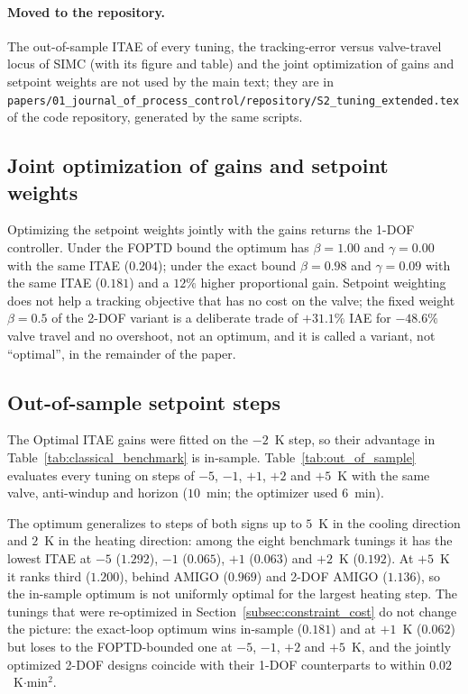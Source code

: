 \paragraph{Moved to the repository.} The out-of-sample ITAE of every tuning, the tracking-error versus valve-travel locus of SIMC (with its figure and table) and the joint optimization of gains and setpoint weights are not used by the main text; they are in \texttt{papers/01\_journal\_of\_process\_control/repository/S2\_tuning\_extended.tex} of the code repository, generated by the same scripts.



\subsection{Joint optimization of gains and setpoint weights}
Optimizing the setpoint weights jointly with the gains returns the 1-DOF controller. Under the FOPTD bound the optimum has $\beta = 1.00$ and $\gamma = 0.00$ with the same ITAE ($0.204$); under the exact bound $\beta = 0.98$ and $\gamma = 0.09$ with the same ITAE ($0.181$) and a $12\%$ higher proportional gain. Setpoint weighting does not help a tracking objective that has no cost on the valve; the fixed weight $\beta = 0.5$ of the 2-DOF variant is a deliberate trade of $+31.1\%$ IAE for $-48.6\%$ valve travel and no overshoot, not an optimum, and it is called a variant, not ``optimal'', in the remainder of the paper.


\subsection{Out-of-sample setpoint steps}
\label{subsec:oos}
The Optimal ITAE gains were fitted on the $-2$~K step, so their advantage in Table~\ref{tab:classical_benchmark} is in-sample. Table~\ref{tab:out_of_sample} evaluates every tuning on steps of $-5$, $-1$, $+1$, $+2$ and $+5$~K with the same valve, anti-windup and horizon ($10$~min; the optimizer used $6$~min).



The optimum generalizes to steps of both signs up to $5$~K in the cooling direction and $2$~K in the heating direction: among the eight benchmark tunings it has the lowest ITAE at $-5$ ($1.292$), $-1$ ($0.065$), $+1$ ($0.063$) and $+2$~K ($0.192$). At $+5$~K it ranks third ($1.200$), behind AMIGO ($0.969$) and 2-DOF AMIGO ($1.136$), so the in-sample optimum is not uniformly optimal for the largest heating step. The tunings that were re-optimized in Section~\ref{subsec:constraint_cost} do not change the picture: the exact-loop optimum wins in-sample ($0.181$) and at $+1$~K ($0.062$) but loses to the FOPTD-bounded one at $-5$, $-1$, $+2$ and $+5$~K, and the jointly optimized 2-DOF designs coincide with their 1-DOF counterparts to within $0.02$~K$\cdot$min$^2$.

